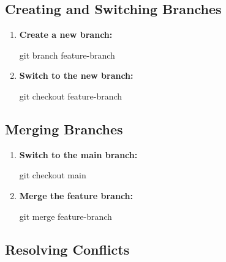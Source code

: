 \documentclass[
  letterpaper,
  DIV=11,
  numbers=noendperiod]{scrreprt}
\newenvironment{Shaded}{\begin{snugshade}}{\end{snugshade}}
\newcommand{\FunctionTok}[1]{\textcolor[rgb]{0.28,0.35,0.67}{#1}}
\newcommand{\NormalTok}[1]{\textcolor[rgb]{0.00,0.23,0.31}{#1}}
\begin{document}
\subsection{Creating and Switching
Branches}\label{creating-and-switching-branches}

\begin{enumerate}
\def\labelenumi{\arabic{enumi}.}
\item
  \textbf{Create a new branch:}

\begin{Shaded}
\begin{Highlighting}[]
\FunctionTok{git}\NormalTok{ branch feature{-}branch}
\end{Highlighting}
\end{Shaded}
\item
  \textbf{Switch to the new branch:}

\begin{Shaded}
\begin{Highlighting}[]
\FunctionTok{git}\NormalTok{ checkout feature{-}branch}
\end{Highlighting}
\end{Shaded}
\end{enumerate}

\subsection{Merging Branches}\label{merging-branches-1}

\begin{enumerate}
\def\labelenumi{\arabic{enumi}.}
\item
  \textbf{Switch to the main branch:}

\begin{Shaded}
\begin{Highlighting}[]
\FunctionTok{git}\NormalTok{ checkout main}
\end{Highlighting}
\end{Shaded}
\item
  \textbf{Merge the feature branch:}

\begin{Shaded}
\begin{Highlighting}[]
\FunctionTok{git}\NormalTok{ merge feature{-}branch}
\end{Highlighting}
\end{Shaded}
\end{enumerate}

\subsection{Resolving Conflicts}\label{resolving-conflicts}
\end{document}
